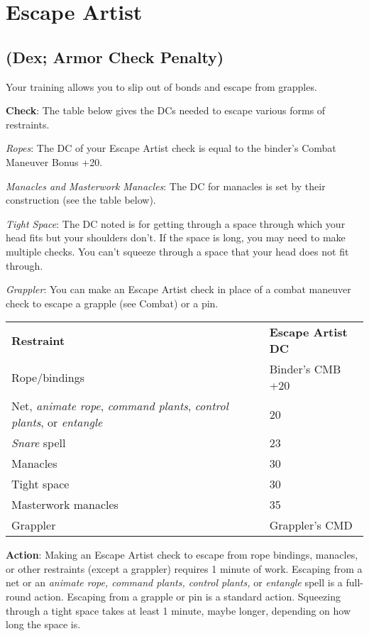 \section{Escape Artist}

\label{f0}				
\subsection{(Dex; Armor Check Penalty)}

				
Your training allows you to slip out of bonds and escape from grapples.
				
\textbf{Check}: The table below gives the DCs needed to escape various forms of restraints.
				
\textit{Ropes}: The DC of your Escape Artist check is equal to the binder's Combat Maneuver Bonus +20.
				
\textit{Manacles and Masterwork Manacles}: The DC for manacles is set by their construction (see the table below).
				
\textit{Tight Space}: The DC noted is for getting through a space through which your head fits but your shoulders don't. If the space is long, you may need to make multiple checks. You can't squeeze through a space that your head does not fit through.
				
\textit{Grappler}: You can make an Escape Artist check in place of a combat maneuver check to escape a grapple (see Combat) or a pin.

\begin{table}
\sffamily
 \begin{tabularx}{\linewidth}{Xl}
\textbf{Restraint} & \textbf{Escape Artist DC}\\
Rope/bindings & Binder's CMB +20\\
Net, \textit{animate rope}, \textit{command plants}, \textit{control plants}, or \textit{entangle} & 20\\
\textit{Snare} spell & 23\\
Manacles & 30\\
Tight space & 30\\
Masterwork manacles & 35\\
Grappler & Grappler's CMD\\
 \end{tabularx}

\end{table}

				
\textbf{Action}: Making an Escape Artist check to escape from rope bindings, manacles, or other restraints (except a grappler) requires 1 minute of work. Escaping from a net or an \textit{animate rope, command plants, control plants, }or \textit{entangle }spell is a full-round action. Escaping from a grapple or pin is a standard action. Squeezing through a tight space takes at least 1 minute, maybe longer, depending on how long the space is.
				
